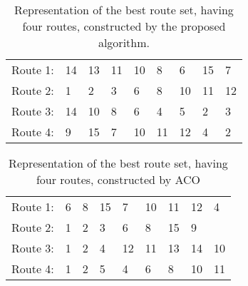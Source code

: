 \begin{table}[H]
    \centering
    \begin{tabular}{|l|llllllll|}
    \hline
    Route 1: & 14 & 13 & 11 & 10 & 8 & 6 & 15 & 7 \\
    Route 2: & 1 & 2 & 3 & 6 & 8 & 10 & 11 & 12 \\
    Route 3: & 14 & 10 & 8 & 6 & 4 & 5 & 2 & 3 \\
    Route 4: & 9 & 15 & 7 & 10 & 11 & 12 & 4 & 2 \\
    \hline
    \end{tabular}
    \caption {Representation of the best route set, having four routes, constructed by the proposed algorithm.}
    \label{table:performanceComparison_bestRouteSet4}
\end{table}


\begin{table}[H]
    \centering
    \begin{tabular}{|l|llllllll|}
    \hline
    Route 1: & 6 & 8 & 15 & 7 & 10 & 11 & 12 & 4 \\
    Route 2: & 1 & 2 & 3 & 6 & 8 & 15 & 9 &  \\
    Route 3: & 1 & 2 & 4 & 12 & 11 & 13 & 14 & 10 \\
    Route 4: & 1 & 2 & 5 & 4 & 6 & 8 & 10 & 11 \\
    \hline
    \end{tabular}
    \caption {Representation of the best route set, having four routes, constructed by ACO}
    \label{table:performanceComparison_bestRouteSet4_ACO}
\end{table}

